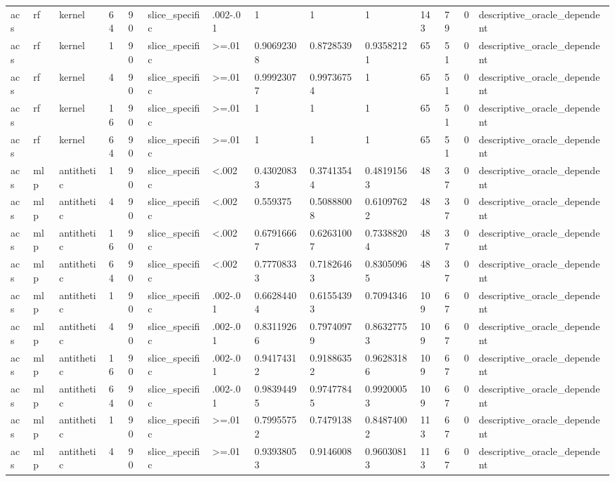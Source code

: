 \begin{tabular}{llllllllllllll}
acs & rf & kernel & 64 & 90 & slice\_specific & .002-.01 & 1 & 1 & 1 & 143 & 79 & 0 & descriptive\_oracle\_dependent \\
acs & rf & kernel & 1 & 90 & slice\_specific & >=.01 & 0.90692308 & 0.8728539 & 0.93582121 & 65 & 51 & 0 & descriptive\_oracle\_dependent \\
acs & rf & kernel & 4 & 90 & slice\_specific & >=.01 & 0.99923077 & 0.99736754 & 1 & 65 & 51 & 0 & descriptive\_oracle\_dependent \\
acs & rf & kernel & 16 & 90 & slice\_specific & >=.01 & 1 & 1 & 1 & 65 & 51 & 0 & descriptive\_oracle\_dependent \\
acs & rf & kernel & 64 & 90 & slice\_specific & >=.01 & 1 & 1 & 1 & 65 & 51 & 0 & descriptive\_oracle\_dependent \\
acs & mlp & antithetic & 1 & 90 & slice\_specific & <.002 & 0.43020833 & 0.37413544 & 0.48191563 & 48 & 37 & 0 & descriptive\_oracle\_dependent \\
acs & mlp & antithetic & 4 & 90 & slice\_specific & <.002 & 0.559375 & 0.50888008 & 0.61097622 & 48 & 37 & 0 & descriptive\_oracle\_dependent \\
acs & mlp & antithetic & 16 & 90 & slice\_specific & <.002 & 0.67916667 & 0.62631007 & 0.73388204 & 48 & 37 & 0 & descriptive\_oracle\_dependent \\
acs & mlp & antithetic & 64 & 90 & slice\_specific & <.002 & 0.77708333 & 0.71826463 & 0.83050965 & 48 & 37 & 0 & descriptive\_oracle\_dependent \\
acs & mlp & antithetic & 1 & 90 & slice\_specific & .002-.01 & 0.66284404 & 0.61554393 & 0.7094346 & 109 & 67 & 0 & descriptive\_oracle\_dependent \\
acs & mlp & antithetic & 4 & 90 & slice\_specific & .002-.01 & 0.83119266 & 0.79740979 & 0.86327753 & 109 & 67 & 0 & descriptive\_oracle\_dependent \\
acs & mlp & antithetic & 16 & 90 & slice\_specific & .002-.01 & 0.94174312 & 0.91886352 & 0.96283186 & 109 & 67 & 0 & descriptive\_oracle\_dependent \\
acs & mlp & antithetic & 64 & 90 & slice\_specific & .002-.01 & 0.98394495 & 0.97477845 & 0.99200053 & 109 & 67 & 0 & descriptive\_oracle\_dependent \\
acs & mlp & antithetic & 1 & 90 & slice\_specific & >=.01 & 0.79955752 & 0.7479138 & 0.84874002 & 113 & 67 & 0 & descriptive\_oracle\_dependent \\
acs & mlp & antithetic & 4 & 90 & slice\_specific & >=.01 & 0.93938053 & 0.9146008 & 0.96030813 & 113 & 67 & 0 & descriptive\_oracle\_dependent \\

\end{tabular}
